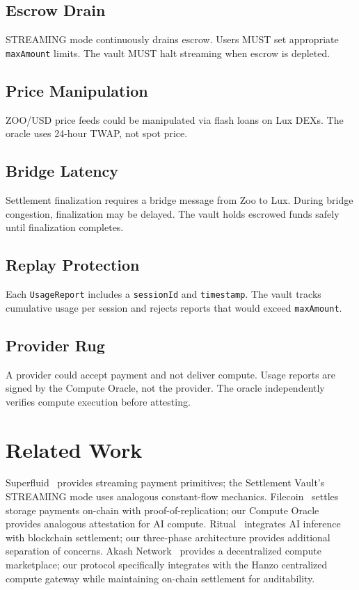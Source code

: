 \documentclass[11pt,letterpaper]{article}
\begin{document}
\subsection{Escrow Drain}

STREAMING mode continuously drains escrow. Users MUST set appropriate \texttt{maxAmount} limits. The vault MUST halt streaming when escrow is depleted.

\subsection{Price Manipulation}

ZOO/USD price feeds could be manipulated via flash loans on Lux DEXs. The oracle uses 24-hour TWAP, not spot price.

\subsection{Bridge Latency}

Settlement finalization requires a bridge message from Zoo to Lux. During bridge congestion, finalization may be delayed. The vault holds escrowed funds safely until finalization completes.

\subsection{Replay Protection}

Each \texttt{UsageReport} includes a \texttt{sessionId} and \texttt{timestamp}. The vault tracks cumulative usage per session and rejects reports that would exceed \texttt{maxAmount}.

\subsection{Provider Rug}

A provider could accept payment and not deliver compute. Usage reports are signed by the Compute Oracle, not the provider. The oracle independently verifies compute execution before attesting.

\section{Related Work}

Superfluid~\cite{superfluid2021} provides streaming payment primitives; the Settlement Vault's STREAMING mode uses analogous constant-flow mechanics. Filecoin~\cite{filecoin2017} settles storage payments on-chain with proof-of-replication; our Compute Oracle provides analogous attestation for AI compute. Ritual~\cite{ritual2023} integrates AI inference with blockchain settlement; our three-phase architecture provides additional separation of concerns. Akash Network~\cite{akash2020} provides a decentralized compute marketplace; our protocol specifically integrates with the Hanzo centralized compute gateway while maintaining on-chain settlement for auditability.
\end{document}
